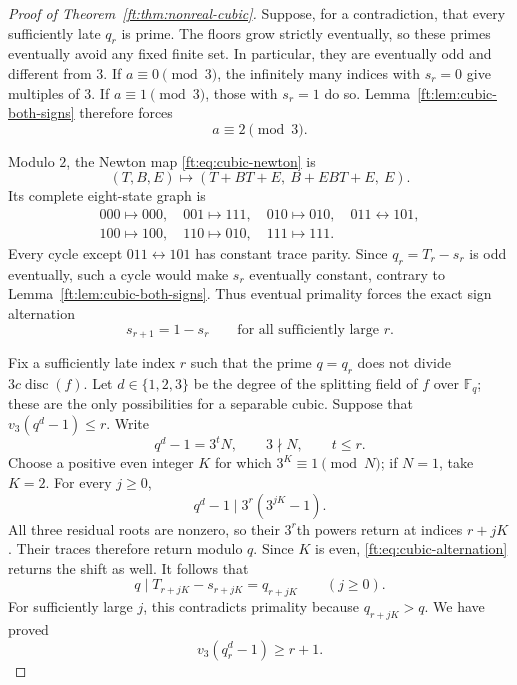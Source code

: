 \documentclass[11pt,a4paper]{article}
\theoremstyle{definition}
\theoremstyle{remark}
\numberwithin{equation}{section}
\begin{document}
\begin{proof}[Proof of Theorem~\ref{ft:thm:nonreal-cubic}]
Suppose, for a contradiction, that every sufficiently late $q_r$ is
prime. The floors grow strictly eventually, so these primes eventually
avoid any fixed finite set. In particular, they are eventually odd and
different from $3$. If $a\equiv0\pmod3$, the infinitely many indices
with $s_r=0$ give multiples of $3$. If $a\equiv1\pmod3$, those with
$s_r=1$ do so. Lemma~\ref{ft:lem:cubic-both-signs} therefore forces
\begin{equation}\label{ft:eq:cubic-a-two}
 a\equiv2\pmod3.
\end{equation}

Modulo $2$, the Newton map \eqref{ft:eq:cubic-newton} is
\[
 (T,B,E)\longmapsto(T+BT+E,\ B+EBT+E,\ E).
\]
Its complete eight-state graph is
\[
 \begin{gathered}
 000\mapsto000,\quad001\mapsto111,\quad010\mapsto010,\quad
 011\leftrightarrow101,\\
 100\mapsto100,\quad110\mapsto010,\quad111\mapsto111.
 \end{gathered}
\]
Every cycle except $011\leftrightarrow101$ has constant trace parity.
Since $q_r=T_r-s_r$ is odd eventually, such a cycle would make $s_r$
eventually constant, contrary to Lemma~\ref{ft:lem:cubic-both-signs}.
Thus eventual primality forces the exact sign alternation
\begin{equation}\label{ft:eq:cubic-alternation}
 s_{r+1}=1-s_r
 \qquad\text{for all sufficiently large }r.
\end{equation}

Fix a sufficiently late index $r$ such that the prime $q=q_r$ does
not divide $3c\operatorname{disc}(f)$. Let $d\in\{1,2,3\}$ be the
degree of the splitting field of $f$ over $\mathbb F_q$; these are
the only possibilities for a separable cubic. Suppose that
$v_3(q^d-1)\leq r$. Write
\[
 q^d-1=3^tN,\qquad 3\nmid N,\qquad t\leq r.
\]
Choose a positive even integer $K$ for which $3^K\equiv1\pmod N$;
if $N=1$, take $K=2$. For every $j\geq0$,
\[
 q^d-1\mid 3^r(3^{jK}-1).
\]
All three residual roots are nonzero, so their $3^r$th powers
return at indices $r+jK$. Their traces therefore return modulo $q$.
Since $K$ is even, \eqref{ft:eq:cubic-alternation} returns the shift
as well. It follows that
\[
 q\mid T_{r+jK}-s_{r+jK}=q_{r+jK}\qquad(j\geq0).
\]
For sufficiently large $j$, this contradicts primality because
$q_{r+jK}>q$. We have proved
\[
 v_3(q_r^d-1)\geq r+1.
\]


\end{proof}
\end{document}
